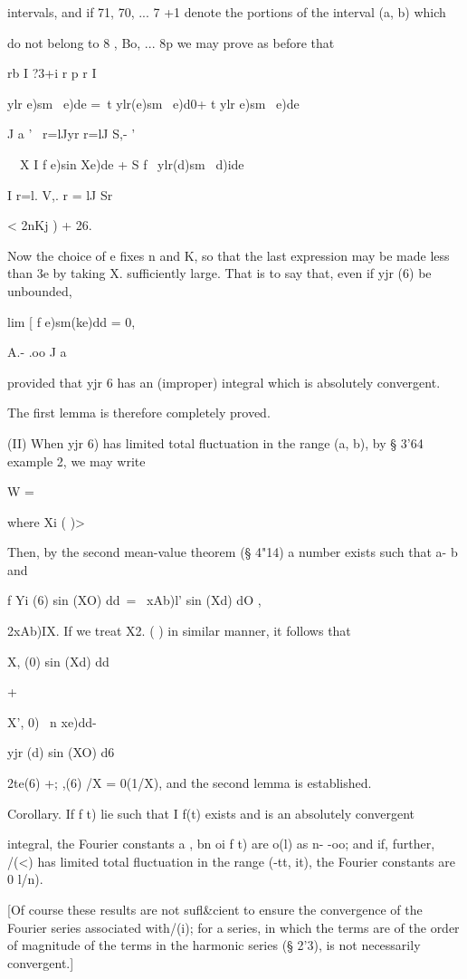 intervals, and if 71, 70, ... 7 +1 denote the portions of the interval
(a, b) which

do not belong to 8 , Bo, ... 8p we may prove as before that

rb I ?3+i r p r I

ylr e)sm \ e)de =\ t ylr(e)sm \ e)d0+ t ylr e)sm \ e)de\

J a ' \ r=lJyr r=lJ S,- '

 \ \ X I f e)sin Xe)de + S f \ ylr(d)sm \ d)ide

I r=l. V,. r = lJ Sr

< 2nKj ) + 26.

Now the choice of e fixes n and K, so that the last expression may be
made less than 3e by taking X. sufficiently large. That is to say
that, even if yjr (6) be unbounded,

lim [ f e)sm(ke)dd = 0,

A.- .oo J a

provided that yjr 6 has an (improper) integral which is absolutely
convergent.

The first lemma is therefore completely proved.

(II) When yjr 6) has limited total fluctuation in the range (a, b), by
§ 3'64 example 2, we may write

 W = %

where Xi ( )> %

Then, by the second mean-value theorem (§ 4"14) a number exists such
that a- b and

f Yi (6) sin (XO) dd\ = \ xAb)l' sin (Xd) dO ,

 2xAb)IX. If we treat X2. ( ) in similar manner, it follows that

X, (0) sin (Xd) dd

+

X', 0) \ n xe)dd-

yjr (d) sin (XO) d6

 2te(6) +; ,(6) /X = 0(1/X), and the second lemma is established.

Corollary. If f t) lie such that I f(t) exists and is an absolutely
convergent

integral, the Fourier constants a , bn oi f t) are o(l) as n- -oo;
and if, further, /(<) has limited total fluctuation in the range (-tt,
it), the Fourier constants are 0 l/n).

[Of course these results are not sufl\&cient to ensure the convergence
of the Fourier series associated with/(i); for a series, in which the
terms are of the order of magnitude of the terms in the harmonic
series (§ 2'3), is not necessarily convergent.]

